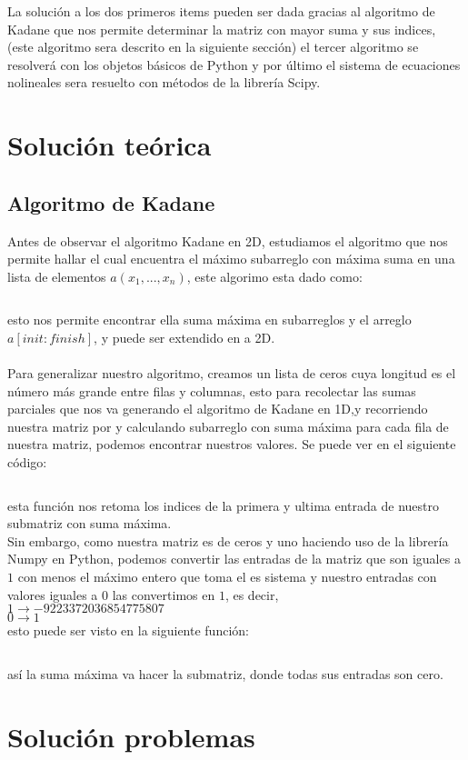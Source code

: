 \documentclass{article}
\begin{document}
{	La solución a los dos primeros items pueden ser dada gracias al algoritmo de Kadane que nos permite determinar la matriz con mayor suma y sus indices, (este algoritmo sera descrito en la siguiente sección) el tercer algoritmo se resolverá con los objetos básicos de Python y por último el sistema de ecuaciones nolineales sera resuelto con métodos de la librería Scipy.
	\newpage
	\section*{Solución teórica}
	\subsection*{Algoritmo de Kadane}
	Antes de observar el algoritmo Kadane en 2D, estudiamos el algoritmo que nos permite hallar el cual encuentra el máximo subarreglo con máxima suma en una lista de elementos $a(x_1,...,x_n)$, este algorimo esta dado como:
	\inputminted{python}{codigos/kadane.py}
	esto nos permite encontrar ella suma máxima en subarreglos y el arreglo $a[init:finish]$, y puede ser extendido en a 2D.\\ \\	
	Para generalizar nuestro algoritmo, creamos un lista de ceros cuya longitud es el número más grande entre filas y columnas, esto para recolectar las sumas parciales que nos va generando el algoritmo de Kadane en 1D,y recorriendo nuestra matriz por y calculando subarreglo con suma máxima para cada fila de nuestra matriz, podemos encontrar nuestros valores. Se puede ver en el siguiente código:	\inputminted{python}{codigos/kadane2D.py}
	esta función nos retoma los indices de la primera y ultima entrada de nuestro submatriz con suma máxima.\\
	Sin embargo, como nuestra matriz es de ceros y uno haciendo uso de la librería Numpy en Python, podemos convertir las entradas de la matriz que son iguales a $1$ con menos el máximo entero que toma el es  sistema y nuestro entradas con valores iguales a $0$ las convertimos en $1$, es decir,\\
	$1\rightarrow -9223372036854775807$\\
	$0\rightarrow 1$\\
	esto puede ser visto en la siguiente función:
	\inputminted{python}{codigos/convert.py}
	así la suma máxima va hacer la submatriz, donde todas sus entradas son cero.
	\section*{Solución problemas}
}
\end{document}
